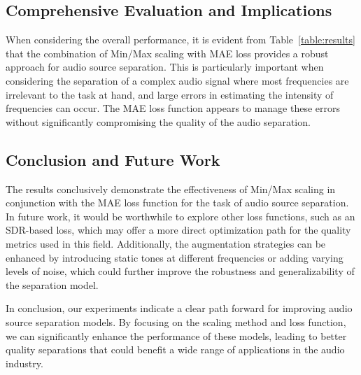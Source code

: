 \documentclass[conference]{IEEEtran}
\begin{document}
\subsection{Comprehensive Evaluation and Implications}

When considering the overall performance, it is evident from Table~\ref{table:results} that the combination of Min/Max scaling with MAE loss provides a robust approach for audio source separation. This is particularly important when considering the separation of a complex audio signal where most frequencies are irrelevant to the task at hand, and large errors in estimating the intensity of frequencies can occur. The MAE loss function appears to manage these errors without significantly compromising the quality of the audio separation.

\subsection{Conclusion and Future Work}

The results conclusively demonstrate the effectiveness of Min/Max scaling in conjunction with the MAE loss function for the task of audio source separation. In future work, it would be worthwhile to explore other loss functions, such as an SDR-based loss, which may offer a more direct optimization path for the quality metrics used in this field. Additionally, the augmentation strategies can be enhanced by introducing static tones at different frequencies or adding varying levels of noise, which could further improve the robustness and generalizability of the separation model.

In conclusion, our experiments indicate a clear path forward for improving audio source separation models. By focusing on the scaling method and loss function, we can significantly enhance the performance of these models, leading to better quality separations that could benefit a wide range of applications in the audio industry.




\end{document}
